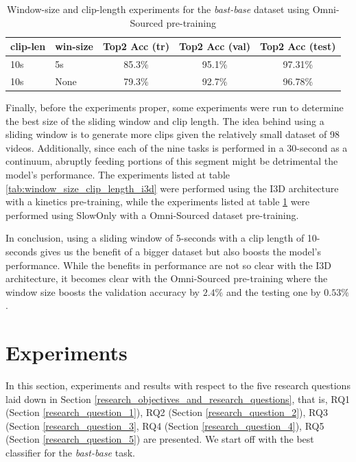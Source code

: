 \documentclass[extern,palatino]{cgMA}
\begin{document}
\begin{table}[h!]
  \begin{center}
    \caption{Window-size and clip-length experiments for the \textit{bast-base} dataset using Omni-Sourced pre-training}
    \label{tab:window_size_clip_length_omni}
    \begin{tabular}{l|l|c|c|c}
      \textbf{clip-len} & \textbf{win-size} & \textbf{Top2 Acc (tr)} & \textbf{Top2 Acc (val)} & \textbf{Top2 Acc (test)}\\
      \hline
      10s & 5s & 85.3\% & 95.1\% & 97.31\% \\
      10s & None & 79.3\% & 92.7\% & 96.78\% \\
    \end{tabular}
  \end{center}
\end{table}

\noindent Finally, before the experiments proper, some experiments were run to determine the best size of the sliding window and clip length. The idea behind using a sliding window is to generate more clips given the relatively small dataset of 98 videos. Additionally, since each of the nine tasks is performed in a 30-second as a continuum, abruptly feeding portions of this segment might be detrimental the model's performance. The experiments listed at table \ref{tab:window_size_clip_length_i3d} were performed using the I3D architecture with a kinetics pre-training, while the experiments listed at table \ref{tab:window_size_clip_length_omni} were performed using SlowOnly with a Omni-Sourced dataset pre-training.

In conclusion, using a sliding window of 5-seconds with a clip length of 10-seconds gives us the benefit of a bigger dataset but also boosts the model's performance. While the benefits in performance are not so clear with the I3D architecture, it becomes clear with the Omni-Sourced pre-training where the window size boosts the validation accuracy by $2.4\%$ and the testing one by $0.53\%$.

\newpage
\section{Experiments}
\label{experiments}

In this section, experiments and results with respect to the five research questions laid down in Section \ref{research_objectives_and_research_questions}, that is, RQ1 (Section \ref{research_question_1}), RQ2 (Section \ref{research_question_2}), RQ3 (Section \ref{research_question_3}, RQ4 (Section \ref{research_question_4}), RQ5 (Section \ref{research_question_5}) are presented. We start off with the best classifier for the \textit{bast-base} task.
\end{document}
